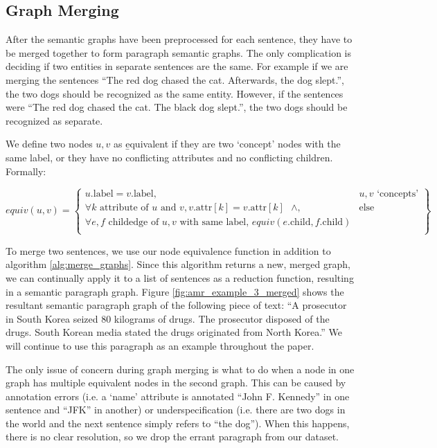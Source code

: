 \documentclass[12pt]{article}
\begin{document}
\subsection{Graph Merging}
After the semantic graphs have been preprocessed for each sentence, they have to be merged together to form paragraph semantic graphs. The only complication is deciding if two entities in separate sentences are the same. For example if we are merging the sentences ``The red dog chased the cat. Afterwards, the dog slept.'', the two dogs should be recognized as the same entity. However, if the sentences were ``The red dog chased the cat. The black dog slept.'', the two dogs should be recognized as separate. 

We define two nodes $u, v$ as {\b equivalent} if they are two `concept' nodes with the same label, or they have no conflicting attributes and no conflicting children. Formally:

\[
    equiv(u,v) = \left\{\begin{array}{lr}
    u.\text{label} = v.\text{label}, & u,v \text{ `concepts'} \\
    \forall k \text{ attribute of } u \text{ and } v, v.\text{attr}[k] = v.\text{attr}[k] \text{ } \land, & \text{else} \\
    \forall e,f \text{ childedge of } u,v \text{ with same label, } equiv(e.\text{child}, f.\text{child}) & \\
    \end{array}\right\}
\]

To merge two sentences, we use our node equivalence function in addition to algorithm \ref{alg:merge_graphs}. Since this algorithm returns a new, merged graph, we can continually apply it to a list of sentences as a reduction function, resulting in a semantic paragraph graph. Figure \ref{fig:amr_example_3_merged} shows the resultant semantic paragraph graph of the following piece of text: ``A prosecutor in South Korea seized 80 kilograms of drugs. The prosecutor disposed of the drugs. South Korean media stated the drugs originated from North Korea.'' We will continue to use this paragraph as an example throughout the paper.

The only issue of concern during graph merging is what to do when a node in one graph has multiple equivalent nodes in the second graph. This can be caused by annotation errors (i.e. a `name' attribute is annotated ``John F. Kennedy'' in one sentence and ``JFK'' in another) or underspecification (i.e. there are two dogs in the world and the next sentence simply refers to ``the dog''). When this happens, there is no clear resolution, so we drop the errant paragraph from our dataset.
\end{document}
